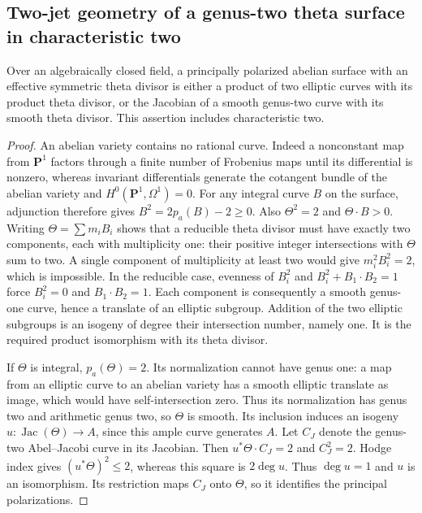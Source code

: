 \subsection{Two-jet geometry of a genus-two theta surface in characteristic two}
\label{subsec:ppav-two-jets}

\begin{lemma}\label{lem:ppav-surface-dichotomy}
Over an algebraically closed field, a principally polarized abelian surface
with an effective symmetric theta divisor is either a product of two elliptic
curves with its product theta divisor, or the Jacobian of a smooth genus-two
curve with its smooth theta divisor. This assertion includes characteristic two.
\end{lemma}
\begin{proof}
An abelian variety contains no rational curve. Indeed a nonconstant map from
$\mathbf P^1$ factors through a finite number of Frobenius maps until its
differential is nonzero, whereas invariant differentials generate the
cotangent bundle of the abelian variety and $H^0(\mathbf P^1,\Omega^1)=0$.
For any integral curve $B$ on the surface, adjunction therefore gives
$B^2=2p_a(B)-2\ge0$. Also $\Theta^2=2$ and $\Theta\cdot B>0$.
Writing $\Theta=\sum m_iB_i$ shows that a reducible theta divisor must
have exactly two components, each with multiplicity one: their positive
integer intersections with $\Theta$ sum to two. A single component of
multiplicity at least two would give $m_i^2B_i^2=2$, which is impossible.
In the reducible case, evenness of $B_i^2$ and
$B_i^2+B_1\cdot B_2=1$ force $B_i^2=0$ and $B_1\cdot B_2=1$.
Each component is consequently a smooth genus-one curve, hence a translate
of an elliptic subgroup. Addition of the two elliptic subgroups is an
isogeny of degree their intersection number, namely one. It is the
required product isomorphism with its theta divisor.

If $\Theta$ is integral, $p_a(\Theta)=2$. Its normalization cannot have
genus one: a map from an elliptic curve to an abelian variety has a smooth
elliptic translate as image, which would have self-intersection zero.
Thus its normalization has genus two and arithmetic genus two, so
$\Theta$ is smooth. Its inclusion induces an isogeny
$u:\operatorname{Jac}(\Theta)\to A$, since this ample curve generates
$A$. Let $C_J$ denote the genus-two Abel--Jacobi curve in its Jacobian.
Then $u^*\Theta\cdot C_J=2$ and $C_J^2=2$. Hodge index gives
$(u^*\Theta)^2\le2$, whereas this square is $2\deg u$.
Thus $\deg u=1$ and $u$ is an isomorphism. Its restriction maps
$C_J$ onto $\Theta$, so it identifies the principal polarizations.
\end{proof}


